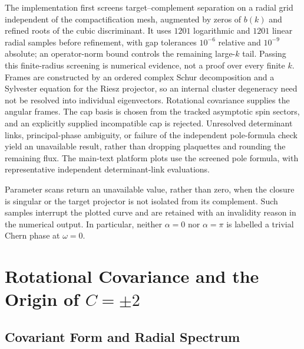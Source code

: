 \documentclass[11pt]{article}
\numberwithin{equation}{section}
\begin{document}
The implementation first screens target--complement separation on a radial
grid independent of the compactification mesh, augmented by zeros of $b(k)$
and refined roots of the cubic discriminant. It uses $1201$ logarithmic and
$1201$ linear radial samples before refinement, with gap tolerances
$10^{-6}$ relative and $10^{-9}$ absolute; an operator-norm bound controls
the remaining large-$k$ tail. Passing this finite-radius screening is
numerical evidence, not a proof over every finite $k$.
Frames are constructed by an ordered complex Schur decomposition and a
Sylvester equation for the Riesz projector, so an internal cluster
degeneracy need not be resolved into individual eigenvectors. Rotational
covariance supplies the angular frames. The cap basis is chosen from the
tracked asymptotic spin sectors, and an explicitly supplied incompatible
cap is rejected. Unresolved determinant links, principal-phase ambiguity,
or failure of the independent pole-formula check yield an unavailable
result, rather than dropping plaquettes and rounding the remaining flux.
The main-text platform plots use the screened pole formula, with
representative independent determinant-link evaluations.

Parameter scans return an unavailable value, rather than zero, when the
closure is singular or the target projector is not isolated from its
complement. Such samples interrupt the plotted curve and are retained with
an invalidity reason in the numerical output. In particular, neither
$\alpha=0$ nor $\alpha=\pi$ is labelled a trivial Chern phase at $\omega=0$.

\section{Rotational Covariance and the Origin of \texorpdfstring{$C=\pm2$}{C = +/-2}}

\subsection{Covariant Form and Radial Spectrum}
\end{document}
